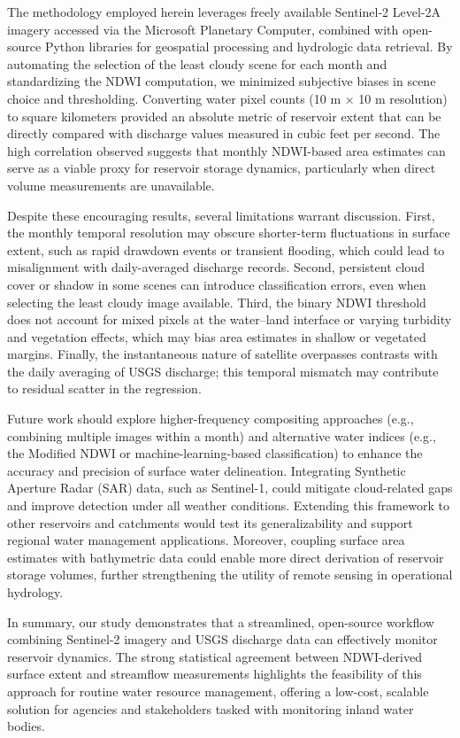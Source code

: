 \documentclass[preprint,12pt]{elsarticle}
\begin{document}
The methodology employed herein leverages freely available Sentinel-2 Level-2A imagery accessed via the Microsoft Planetary Computer, combined with open-source Python libraries for geospatial processing and hydrologic data retrieval. By automating the selection of the least cloudy scene for each month and standardizing the NDWI computation, we minimized subjective biases in scene choice and thresholding. Converting water pixel counts (10 m × 10 m resolution) to square kilometers provided an absolute metric of reservoir extent that can be directly compared with discharge values measured in cubic feet per second. The high correlation observed suggests that monthly NDWI-based area estimates can serve as a viable proxy for reservoir storage dynamics, particularly when direct volume measurements are unavailable.

Despite these encouraging results, several limitations warrant discussion. First, the monthly temporal resolution may obscure shorter-term fluctuations in surface extent, such as rapid drawdown events or transient flooding, which could lead to misalignment with daily-averaged discharge records. Second, persistent cloud cover or shadow in some scenes can introduce classification errors, even when selecting the least cloudy image available. Third, the binary NDWI threshold does not account for mixed pixels at the water–land interface or varying turbidity and vegetation effects, which may bias area estimates in shallow or vegetated margins. Finally, the instantaneous nature of satellite overpasses contrasts with the daily averaging of USGS discharge; this temporal mismatch may contribute to residual scatter in the regression.

Future work should explore higher-frequency compositing approaches (e.g., combining multiple images within a month) and alternative water indices (e.g., the Modified NDWI or machine-learning-based classification) to enhance the accuracy and precision of surface water delineation. Integrating Synthetic Aperture Radar (SAR) data, such as Sentinel-1, could mitigate cloud-related gaps and improve detection under all weather conditions. Extending this framework to other reservoirs and catchments would test its generalizability and support regional water management applications. Moreover, coupling surface area estimates with bathymetric data could enable more direct derivation of reservoir storage volumes, further strengthening the utility of remote sensing in operational hydrology.

In summary, our study demonstrates that a streamlined, open-source workflow combining Sentinel-2 imagery and USGS discharge data can effectively monitor reservoir dynamics. The strong statistical agreement between NDWI-derived surface extent and streamflow measurements highlights the feasibility of this approach for routine water resource management, offering a low-cost, scalable solution for agencies and stakeholders tasked with monitoring inland water bodies.
\end{document}
